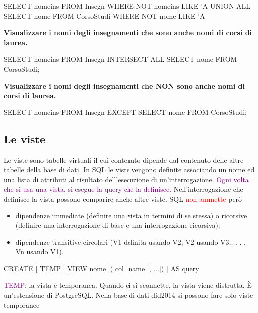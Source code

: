 \begin{codiceSQL}
  SELECT nomeins
FROM Insegn
WHERE NOT nomeins LIKE 'A%
UNION ALL
SELECT nome
FROM CorsoStudi
WHERE NOT nome LIKE 'A%
\end{codiceSQL}

    
\textbf{\large
  Visualizzare i nomi degli insegnamenti che sono anche nomi 
di corsi di laurea.
}

\begin{codiceSQL}
  SELECT nomeins
FROM Insegn
INTERSECT ALL
SELECT nome
FROM CorsoStudi;
\end{codiceSQL}

\textbf{\large Visualizzare i nomi degli insegnamenti che NON sono anche 
nomi di corsi di laurea.}

\begin{codiceSQL}
  SELECT nomeins
FROM Insegn
EXCEPT
SELECT nome
FROM CorsoStudi;
\end{codiceSQL}

\subsection{Le viste}

Le viste sono tabelle virtuali il cui contenuto dipende dal contenuto delle altre 
tabelle della base di dati.
In SQL le viste vengono definite associando un nome ed una lista di attributi al 
risultato dell’esecuzione di un’interrogazione.
\textcolor{purple}{Ogni volta che si usa una vista, si esegue la query che la definisce.}
Nell’interrogazione che definisce la vista possono comparire anche altre viste.
SQL \textcolor{red}{non ammette} però
\begin{itemize}
  \item  dipendenze immediate (definire una vista in termini di se stessa) o ricorsive 
(definire una interrogazione di base e una interrogazione ricorsiva);
\item dipendenze transitive circolari (V1 definita usando V2, V2 usando V3,. . . , Vn
usando V1).
\end{itemize}

\begin{codiceSQL}
  CREATE [ TEMP ] VIEW nome [( col_name [, ...]) ] AS query

\end{codiceSQL}

\textcolor{purple}{TEMP}: la vista è temporanea. Quando ci si sconnette, la vista viene distrutta. È 
un’estensione di PostgreSQL. Nella base di dati did2014 si possono fare solo 
viste temporanee

